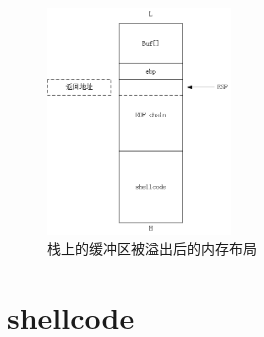 \documentclass[bachelor]{thesis-uestc}
\begin{document}
\begin{figure}[htbp]
	\centering\includegraphics[height=6cm]{images/stack2.png}
	\caption{栈上的缓冲区被溢出后的内存布局}
	\label{fig:stack2}
\end{figure}

\section{shellcode}
\end{document}
